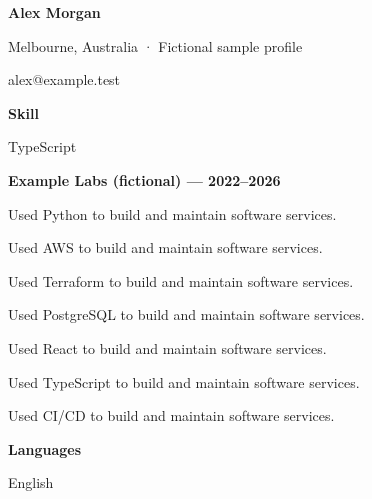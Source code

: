 \documentclass[10pt,a4paper]{article}
\begin{document}
{\LARGE\bfseries\color{navy} Alex Morgan}\par
Melbourne, Australia · Fictional sample profile\par
alex@example.test\par
{\large\bfseries\color{navy} Skill}\par
TypeScript\par
{\large\bfseries\color{navy} Example Labs (fictional) — 2022–2026}\par
Used Python to build and maintain software services.\par
Used AWS to build and maintain software services.\par
Used Terraform to build and maintain software services.\par
Used PostgreSQL to build and maintain software services.\par
Used React to build and maintain software services.\par
Used TypeScript to build and maintain software services.\par
Used CI/CD to build and maintain software services.\par
{\large\bfseries\color{navy} Languages}\par
English\par
\end{document}
